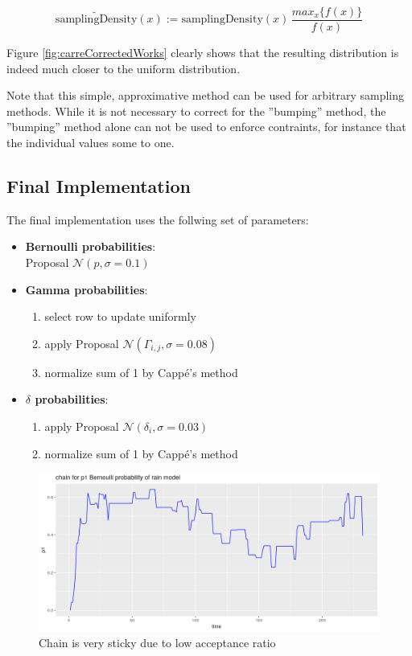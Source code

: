 \[
\tilde{\text{samplingDensity}}(x) := \text{samplingDensity}(x) \, \frac{max_x\{ f(x) \}}{f(x)}
\]

Figure \ref{fig:carreCorrectedWorks} clearly shows that the resulting distribution is indeed much closer to the uniform distribution. 


Note that this simple, approximative method can be used for arbitrary sampling methods. While it is not necessary to correct for the ''bumping'' method, the ''bumping'' method alone can not be used to enforce contraints, for instance that the individual values some to one. 



\subsection{Final Implementation}

The final implementation uses the follwing set of parameters:
\begin{itemize}
	\item \textbf{Bernoulli probabilities}:\\
		Proposal $\mathcal{N}\left( p, \sigma = 0.1 \right)$
	\item \textbf{Gamma probabilities}:
		\begin{enumerate}
			\item select row to update uniformly
			\item apply Proposal $\mathcal{N}\left( \Gamma_{i,j}, \sigma = 0.08 \right)$
			\item normalize sum of 1 by Cappé's method
		\end{enumerate}
	\item \textbf{$\delta$ probabilities}:
		\begin{enumerate}
			\item apply Proposal $\mathcal{N}\left( \delta_i, \sigma = 0.03 \right)$
			\item normalize sum of 1 by Cappé's method
		\end{enumerate}
\end{itemize}

\begin{figure}
	\includegraphics[width=\linewidth]{img/impl_very_sticky_no_thinning.png}
	\caption{Chain is very sticky due to low acceptance ratio}
	\label{fig:sticky_chain_is_okay}
\end{figure} 

